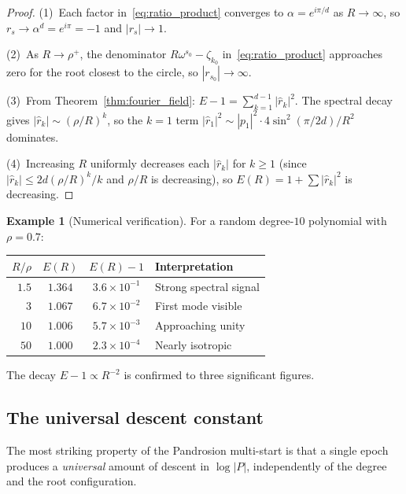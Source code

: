 \documentclass[10pt,a4paper,oneside]{book}
\theoremstyle{definition}
\newtheorem{example}[theorem]{Example}
\theoremstyle{remark}
\begin{document}
\begin{proof}
(1)~Each factor in~\eqref{eq:ratio_product} converges to $\alpha = e^{i\pi/d}$ as $R \to \infty$, so $r_s \to \alpha^d = e^{i\pi} = -1$ and $|r_s| \to 1$.

(2)~As $R \to \rho^+$, the denominator $R\omega^{s_0} - \zeta_{k_0}$ in~\eqref{eq:ratio_product} approaches zero for the root closest to the circle, so $|r_{s_0}| \to \infty$.

(3)~From Theorem~\ref{thm:fourier_field}: $E - 1 = \sum_{k=1}^{d-1}|\hat{r}_k|^2$.  The spectral decay gives $|\hat{r}_k| \sim (\rho/R)^k$, so the $k=1$ term $|\hat{r}_1|^2 \sim |p_1|^2 \cdot 4\sin^2(\pi/2d)/R^2$ dominates.

(4)~Increasing $R$ uniformly decreases each $|\hat{r}_k|$ for $k \geq 1$ (since $|\hat{r}_k| \leq 2d(\rho/R)^k/k$ and $\rho/R$ is decreasing), so $E(R) = 1 + \sum|\hat{r}_k|^2$ is decreasing.
\end{proof}

\begin{example}[Numerical verification]
For a random degree-$10$ polynomial with $\rho = 0.7$:
\begin{center}
\renewcommand{\arraystretch}{1.2}
\begin{tabular}{rccl}
\toprule
$R/\rho$ & $E(R)$ & $E(R) - 1$ & Interpretation \\
\midrule
$1.5$ & $1.364$ & $3.6 \times 10^{-1}$ & Strong spectral signal \\
$3$ & $1.067$ & $6.7 \times 10^{-2}$ & First mode visible \\
$10$ & $1.006$ & $5.7 \times 10^{-3}$ & Approaching unity \\
$50$ & $1.000$ & $2.3 \times 10^{-4}$ & Nearly isotropic \\
\bottomrule
\end{tabular}
\end{center}
The decay $E-1 \propto R^{-2}$ is confirmed to three significant figures.
\end{example}

\subsection{The universal descent constant}
\label{sec:pand_descent}

The most striking property of the Pandrosion multi-start is that a single epoch produces a \emph{universal} amount of descent in $\log|P|$, independently of the degree and the root configuration.
\end{document}

